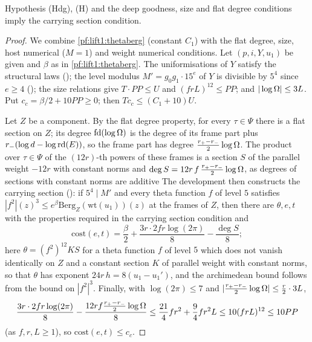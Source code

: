 \begin{theorem}\label{pf:lift1:carry}
Hypothesis (Hdg), (H) and the deep goodness, size and flat degree conditions imply the carrying section
condition.
\end{theorem}

\begin{proof}
We combine \cref{pf:lift1:thetaberg} (constant $C_1$) with the flat degree, size, host numerical
($M=1$) and weight numerical conditions. Let $(p,i,Y,u_1)$ be given and $\beta$ as in
\cref{pf:lift1:thetaberg}. The uniformisations of $Y$ satisfy the structural laws
(); the level modulus $M'=g_0g_1\cdot15^{e}$ of $Y$ is divisible
by $5^4$ since $e\ge4$ (); the size relations give
$T\cdot PP\le U$ and $(frL)^{12}\le PP$; and $|\log\Omega|\le3L$. Put $c_c=\beta/2+10PP\ge0$; then
$Tc_c\le(C_1+10)U$.

Let $Z$ be a component. By the flat degree property, for every $\tau\in\Psi$ there is a flat section on
$Z$; its degree $\mathrm{fd}(\log\Omega)$ is the degree of its frame part plus
$r_-(\log d-\log\mathrm{rd}(E))$, so the frame part has degree $\frac{r_+-r_-}2\log\Omega$. The product over
$\tau\in\Psi$ of the $(12r)$-th powers of these frames is a section $S$ of the parallel weight $-12r$ with
constant norms and
$\deg S=12r\,f\,\frac{r_+-r_-}2\log\Omega$, as degrees of sections with constant norms are additive
The development then constructs the carrying section
(): if $5^4\mid M'$ and every theta function $f$
of level $5$ satisfies $|f^2|(z)^3\le e^\beta\mathrm{Berg}_Z(\mathrm{wt}(u_1))(z)$ at the frames of $Z$,
then there are $\theta,e,t$ with the properties required in the carrying section condition and
\[
\mathrm{cost}(e,t)=\frac\beta2+\frac{3r\cdot2fr\log(2\pi)}8-\frac{\deg S}8 ;
\]
here $\theta=(f^2)^{12}KS$ for a theta function $f$ of level $5$ which does not vanish identically on
$Z$ and a constant section $K$ of parallel weight with constant norms, so that $\theta$ has exponent
$24r\,h=8(u_1-u_1')$, and the archimedean bound follows from the bound on $|f^2|^3$. Finally, with
$\log(2\pi)\le7$ and $|\frac{r_+-r_-}2\log\Omega|\le\frac r2\cdot3L$,
\[
\frac{3r\cdot2fr\log(2\pi)}8-\frac{12rf\frac{r_+-r_-}2\log\Omega}8
\le\frac{21}4fr^2+\frac94fr^2L\le10(frL)^{12}\le10PP
\]
(as $f,r,L\ge1$), so $\mathrm{cost}(e,t)\le c_c$.
\end{proof}

